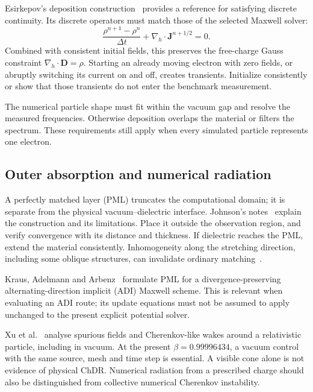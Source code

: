 \documentclass[11pt,a4paper]{article}
\numberwithin{equation}{section}
\begin{document}
Esirkepov's deposition construction~\cite{esirkepov2001charge}
provides a reference for satisfying discrete continuity. Its discrete
operators must match those of the selected Maxwell solver:
\begin{equation}
 \frac{\rho^{n+1}-\rho^n}{\Delta t}
 +\nabla_h\cdot\mathbf J^{n+1/2}=0.
 \label{eq:continuity}
\end{equation}
Combined with consistent initial fields, this preserves the free-charge
Gauss constraint \(\nabla_h\cdot\mathbf D=\rho\).
Starting an already moving electron with zero fields, or abruptly switching
its current on and off, creates transients. Initialize consistently or
show that those transients do not enter the benchmark measurement.

The numerical particle shape must fit within the vacuum gap and resolve
the measured frequencies. Otherwise deposition overlaps the material or
filters the spectrum. These requirements still apply when every simulated
particle represents one electron.

\subsection{Outer absorption and numerical radiation}

A perfectly matched layer (PML) truncates the computational domain;
it is separate from the physical vacuum--dielectric interface.
Johnson's notes~\cite{johnson2021pml} explain the construction and its
limitations. Place it outside the observation region, and verify convergence
with its distance and thickness. If dielectric reaches the PML, extend
the material consistently. Inhomogeneity along the stretching direction,
including some oblique structures, can invalidate ordinary
matching~\cite{meepPML}.

Kraus, Adelmann and Arbenz~\cite{kraus2011adipml} formulate PML for a
divergence-preserving alternating-direction implicit (ADI) Maxwell scheme. This is relevant when
evaluating an ADI route; its update equations must not be assumed to apply
unchanged to the present explicit potential solver.

Xu et al.~\cite{xu2020numericalfields} analyse spurious fields and
Cherenkov-like wakes around a relativistic particle, including in vacuum.
At the present \(\beta=0.99996434\), a vacuum control with the same source,
mesh and time step is essential. A visible cone alone is not evidence
of physical ChDR. Numerical radiation from a prescribed charge should also
be distinguished from collective numerical Cherenkov instability.
\end{document}
